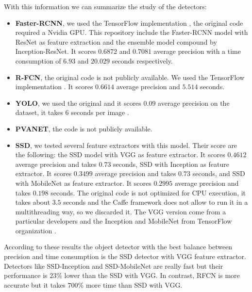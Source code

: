 With this information we can summarize the study of the detectors:

\begin{itemize}

\item \textbf{Faster-RCNN}, we used the TensorFlow implementation \cite{tensorObjectdte}, the original code required a Nvidia GPU. This repository include the Faster-RCNN model with ResNet as feature extraction and the ensemble model compound by Inception-ResNet. It scores $0.6872$ and $0.7081$ average precision with a time consumption of  $6.93$ and  $20.029$ seconds respectively.



\item \textbf{R-FCN}, the original code is not publicly available. We used the TensorFlow implementation \cite{tensorObjectdte}. It scores $0.6614$ average precision and $5.514$ seconds.


\item \textbf{YOLO}, we used the original and it scores $0.09$ average precision on the dataset, it takes $6$ seconds per image \cite{yoloDark}. 

\item \textbf{PVANET}, the code is not publicly available.

\item \textbf{SSD}, we tested several feature extractors with this model. Their score are the following: the SSD model with VGG as feature extractor. It scores $0.4612$ average precision and  takes $0.73$ seconds, SSD with Inception as feature extractor. It scores $0.3499$ average precision and  takes $0.73$ seconds, and SSD with MobileNet as feature extractor. It scores $0.2995$ average precision and  takes $0.198$ seconds. The original code \cite{ssdCode2} is not optimized for CPU execution, it takes about $3.5$ seconds and the Caffe framework does not allow to run it in a multithreading way, so we discarded it. The VGG version come from a particular developers \cite{ssdCode} and the Inception and MobileNet from TensorFlow organization \cite{tensorObjectdte}.


\end{itemize}

According to these results the object detector with the best balance between precision and time consumption is the SSD detector with VGG feature extractor. Detectors like SSD-Inception and SSD-MobileNet are really fast but their performance is $23 \%$ lower than the SSD with VGG. In contrast, RFCN is more accurate but it takes $700 \%$ more time than SSD with VGG.


